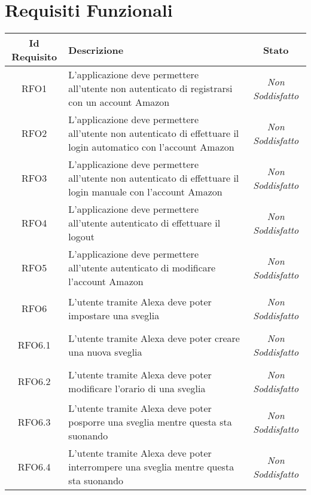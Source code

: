\section{Requisiti Funzionali}
\normalsize
\begin{longtable}{|c|>{\centering}m{7cm}|c|}
	\hline 
	\textbf{Id Requisito} & \textbf{Descrizione} & \textbf{Stato}\\
	\hline
	\endhead
	\hypertarget{RFO1}{RFO1} & L'applicazione deve permettere all'utente non autenticato di registrarsi con un account Amazon & \textit{Non Soddisfatto}\\ \hline
	
	\hypertarget{RFO2}{RFO2} & L'applicazione deve permettere all'utente non autenticato di effettuare il login automatico con l'account Amazon & \textit{Non Soddisfatto}\\ \hline
	
	\hypertarget{RFO3}{RFO3} & L'applicazione deve permettere all'utente non autenticato di effettuare il login manuale con l'account Amazon & \textit{Non Soddisfatto}\\ \hline
	
	\hypertarget{RFO4}{RFO4} & L'applicazione deve permettere all'utente autenticato di effettuare il logout & \textit{Non Soddisfatto}\\ \hline
	
	\hypertarget{RFO5}{RFO5} & L'applicazione deve permettere all'utente autenticato di modificare l'account Amazon & \textit{Non Soddisfatto}\\ \hline
	
	\hypertarget{RFO6}{RFO6} & L'utente tramite Alexa deve poter impostare una sveglia & \textit{Non Soddisfatto}\\ \hline
	
	\hypertarget{RFO6.1}{RFO6.1} & L'utente tramite Alexa deve poter creare una nuova sveglia & \textit{Non Soddisfatto}\\ \hline
	
	\hypertarget{RFO6.2}{RFO6.2} & L'utente tramite Alexa deve poter modificare l'orario di una sveglia & \textit{Non Soddisfatto}\\ \hline
	
	\hypertarget{RFO6.3}{RFO6.3} & L'utente tramite Alexa deve poter posporre una sveglia mentre questa sta suonando & \textit{Non Soddisfatto}\\ \hline
	
	\hypertarget{RFO6.4}{RFO6.4} & L'utente tramite Alexa deve poter interrompere una sveglia mentre questa sta suonando & \textit{Non Soddisfatto}\\ \hline
	

\end{longtable}
